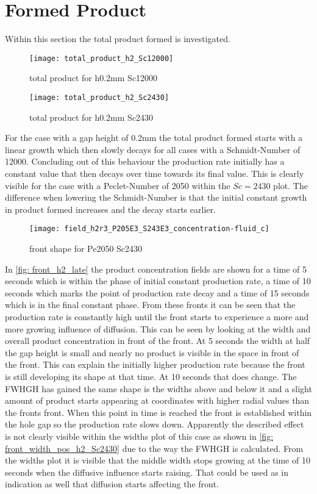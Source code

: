 \documentclass[../thesis.tex]{subfiles}
\begin{document}
\section{Formed Product}

Within this section the total product formed is investigated.

\begin{figure}[htbp]
	\centering
	\texttt{[image: total\_product\_h2\_Sc12000]}
	\caption{total product for h0.2mm Sc12000\label{fig: total_prod_h2_Sc12000}}\bigskip
	\texttt{[image: total\_product\_h2\_Sc2430]}
	\caption{total product for h0.2mm Sc2430\label{fig: total_prod_h2_Sc2430}}
\end{figure}

For the case with a gap height of 0.2mm the total product formed starts with a linear growth which then slowly decays for all cases with a Schmidt-Number of 12000. Concluding out of this behaviour the production rate initially has a constant value that then decays over time towards its final value. This is clearly visible for the case with a Peclet-Number of 2050 within the $Sc = 2430$ plot. The difference when lowering the Schmidt-Number is that the initial constant growth in product formed increases and the decay starts earlier.
\begin{figure}[htb]
	\centering
	\texttt{[image: field\_h2r3\_P205E3\_S243E3\_concentration-fluid\_c]}
	\caption{front shape for Pe2050 Sc2430}
	\label{fig: front_h2_late}
\end{figure}
In \autoref{fig: front_h2_late} the product concentration fields are shown for a time of 5 seconds which is within the phase of initial constant production rate, a time of 10 seconds which marks the point of production rate decay and a time of 15 seconds which is in the final constant phase. From these fronts it can be seen that the production rate is constantly high until the front starts to experience a more and more growing influence of diffusion. This can be seen by looking at the width and overall product concentration in front of the front. At 5 seconds the width at half the gap height is small and nearly no product is visible in the space in front of the front. This can explain the initially higher production rate because the front is still developing its shape at that time. At 10 seconds that does change. The FWHGH has gained the same shape is the widths above and below it and a slight amount of product starts appearing at coordinates with higher radial values than the fronts front. When this point in time is reached the front is established within the hole gap so the production rate slows down. Apparently the described effect is not clearly visible within the widths plot of this case as shown in \autoref{fig: front_width_pos_h2_Sc2430} due to the way the FWHGH is calculated. From the widths plot it is visible that the middle width stops growing at the time of 10 seconds when the diffusive influence starts raising. That could be used as in indication as well that diffusion starts affecting the front.
\end{document}
